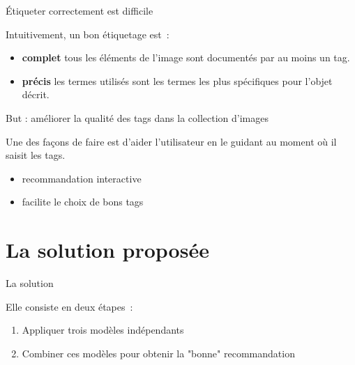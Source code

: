 \documentclass{beamer}
\begin{document}
\begin{frame}{Étiqueter correctement est difficile}
	
	Intuitivement, un bon étiquetage est~:
	\begin{itemize}
        \item \textbf{complet} 
        tous les éléments de l'image sont documentés par au moins un tag.
        \item \textbf{précis} 
        les termes utilisés sont les termes les plus spécifiques pour l'objet décrit.
	\end{itemize}

\end{frame}

%	


\begin{frame}{But : améliorer la qualité des tags dans la collection d'images}
	
	Une des façons de faire est d'aider l'utilisateur en le guidant au moment où il saisit les tags.
	
	\begin{itemize}
        \item recommandation interactive
        \item facilite le choix de bons tags
	\end{itemize}

\end{frame}


\section{La solution proposée}

\begin{frame}{La solution}
	
	Elle consiste en deux étapes~:
	\begin{enumerate}
        \item Appliquer trois modèles indépendants 
        \item Combiner ces modèles pour obtenir la "bonne" recommandation
	\end{enumerate}

\end{frame}
\end{document}
